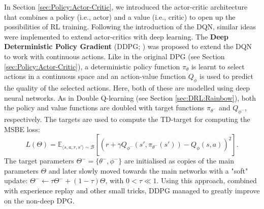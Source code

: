 In Section \ref{sec:Policy:Actor-Critic}, we introduced the actor-critic architecture that combines a policy (i.e., actor) and a value (i.e., critic) to open up the possibilities of RL training. Following the introduction of the DQN, similar ideas were implemented to extend actor-critics with deep learning. The \textbf{Deep Deterministic Policy Gradient} (DDPG; \cite{Lillicrap2015_DDPG}) was proposed to extend the DQN to work with continuous actions. Like in the original DPG (see Section \ref{sec:Policy:Actor-Critic}), a deterministic policy function $\pi_\theta$ is learnt to select actions in a continuous space and an action-value function $Q_\phi$ is used to predict the quality of the selected actions. Here, both of these are modelled using deep neural networks. As in Double Q-learning (see Section \ref{sec:DRL:Rainbow}), both the policy and value functions are doubled with target functions $\pi_{\theta^-}$ and $Q_{\phi^-}$, respectively. The targets are used to compute the TD-target for computing the MSBE loss:
\begin{equation}
    L(\Theta)=\mathbb{E}_{\langle s,a,r,s'\rangle\sim\mathcal{B}}\left[\left(r+\gamma Q_{\phi^-}(s',\pi_{\theta^-}(s'))-Q_\phi(s,a)\right)^2\right].
    \label{eq:DDPG}
\end{equation}
The target parameters $\Theta^-=\{\theta^-,\phi^-\}$ are initialised as copies of the main parameters $\Theta$ and later slowly moved towards the main networks with a "soft" update: $\Theta^-\leftarrow\tau\Theta^-+(1-\tau)\Theta$, with $0<\tau\ll1$. Using this approach, combined with experience replay and other small tricks, DDPG managed to greatly improve on the non-deep DPG. 

